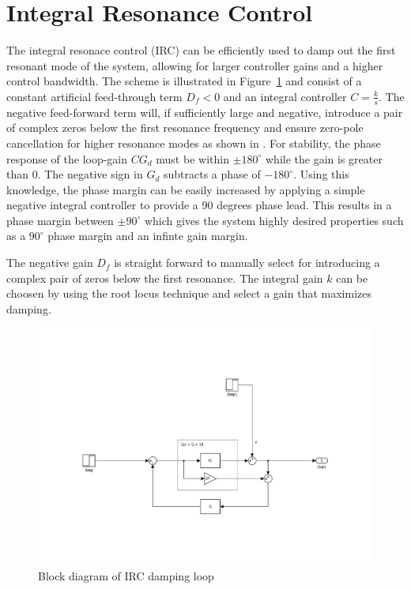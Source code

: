 \section{Integral Resonance Control}
The integral resonace control (IRC) can be efficiently used to damp out the first resonant mode of the system, allowing for larger controller gains and a higher control bandwidth. The \abbrIRC scheme is illustrated in Figure~\ref{fig:irc} and consist of a constant artificial feed-through term $D_f<0$ and an integral controller $C=\frac{k}{s}$. The negative feed-forward term will, if sufficiently large and negative, introduce a pair of complex zeros below the first resonance frequency and ensure zero-pole cancellation for higher resonance modes as shown in \citep{Aphale:2007}. For stability, the phase response of the loop-gain $CG_d$ must be within $\pm180^{\circ}$ while the gain is greater than 0. The negative sign in $G_d$ subtracts a phase of $-180^{\circ}$. Using this knowledge, the phase margin can be easily increased by applying a simple negative integral controller to provide a 90 degrees phase lead. This results in a phase margin between  $\pm90^{\circ}$ which gives the system highly desired properties such as a $90^{\circ}$ phase margin and an infinte gain margin.

The negative gain $D_f$ is straight forward to manually select for introducing a complex pair of zeros below the first resonance. The integral gain $k$ can be choosen by using the root locus technique and select a gain that maximizes damping.

\begin{figure}[h]
  \centering %
  \includegraphics[width=1\textwidth, trim=5.5cm 3cm 5.1cm 9.5cm, clip=true]{fig/matlab/irc}
  \caption{\label{fig:irc}Block diagram of IRC damping loop}
\end{figure}

